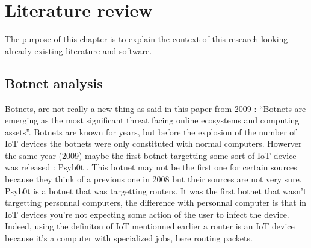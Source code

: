 \documentclass{report}
\begin{document}
\chapter{Literature review}
The purpose of this chapter is to explain the context of this research looking already existing literature and software.\newline
\newline

\section{Botnet analysis}
Botnets, are not really a new thing as said in this paper from 2009 \autocite{feily2009survey} : ``Botnets are emerging as the most significant threat facing online ecosystems and computing assets''. Botnets are known for years, but before the explosion of the number of IoT devices the botnets were only constituted with normal computers. Howerver the same year (2009) maybe the first botnet targetting some sort of IoT device was released : Psyb0t \autocite{durfina2013psybot}. This botnet may not be the first one for certain sources \autocite{angrishi2017turning} because they think of a previous one in 2008 but their sources are not very sure. Psyb0t is a botnet that was targetting routers. It was the first botnet that wasn't targetting personnal computers, the difference with personnal computer is that in IoT devices you're not expecting some action of the user to infect the device. Indeed, using the definiton of IoT mentionned earlier a router is an IoT device because it's a computer with specialized jobs, here routing packets.
\end{document}

